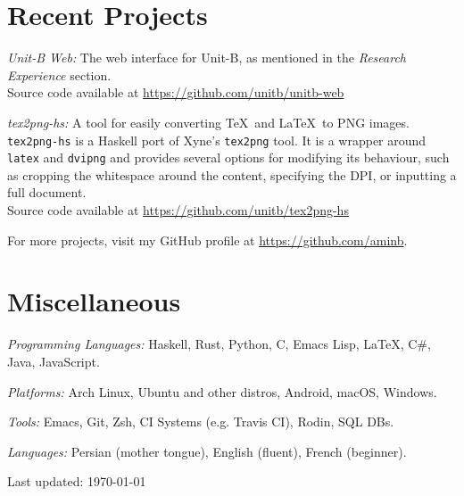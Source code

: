 \documentclass[12pt,letterpaper]{article}
\renewenvironment{itemize}{
  \begin{list}{}{
    \setlength{\leftmargin}{1.5em}
    \setlength{\itemsep}{0.25em}
    \setlength{\parskip}{0pt}
    \setlength{\parsep}{0.25em}
  }
}{
  \end{list}
}
\begin{document}
\section*{Recent Projects}

\begin{itemize}
\item \textit{Unit-B Web:} The web interface for Unit-B, as mentioned in the
  \textit{Research Experience} section.\\
  Source code available at
  \href{https://github.com/unitb/unitb-web}{https://github.com/unitb/unitb-web}

\item \textit{tex2png-hs:} A tool for easily converting \TeX\ and \LaTeX\ to PNG
  images. \verb#tex2png-hs# is a Haskell port of Xyne's \verb#tex2png# tool. It
  is a wrapper around \verb#latex# and \verb#dvipng# and provides several
  options for modifying its behaviour, such as cropping the whitespace around
  the content, specifying the DPI, or inputting a full document.\\
  Source code available at
  \href{https://github.com/unitb/tex2png-hs}{https://github.com/unitb/tex2png-hs}

\item For more projects, visit my GitHub profile at
  \href{https://github.com/aminb}{https://github.com/aminb}.
\end{itemize}

\section*{Miscellaneous}

\begin{itemize}
\item \textit{Programming Languages:} Haskell, Rust, Python, C, Emacs Lisp,
  \LaTeX, C\#, Java, JavaScript.
\item \textit{Platforms:} Arch Linux, Ubuntu and other distros, Android, macOS,
  Windows.
\item \textit{Tools:} Emacs, Git, Zsh, CI Systems (e.g. Travis CI),
  Rodin, SQL DBs.
\item \textit{Languages:} Persian (mother tongue), English (fluent), French
  (beginner).
\end{itemize}


\bigskip
{\small Last updated: \today}
\end{document}
